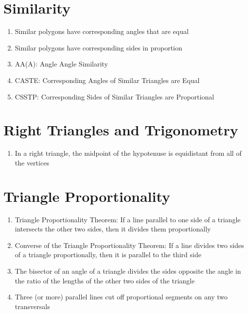\documentclass[11pt,letterpaper]{report}
\begin{document}
\section*{Similarity}
\begin{enumerate}
    \item Similar polygons have corresponding angles that are equal
    \item Similar polygons have corresponding sides in proportion
    \item AA(A): Angle Angle Similarity
    \item CASTE: Corresponding Angles of Similar Triangles are Equal
    \item CSSTP: Corresponding Sides of Similar Triangles are Proportional
\end{enumerate}

\section*{Right Triangles and Trigonometry}
\begin{enumerate}
    \item In a right triangle, the midpoint of the hypotenuse is equidistant from all of the vertices
\end{enumerate}

\section*{Triangle Proportionality}
\begin{enumerate}
    \item Triangle Proportionality Theorem: If a line parallel to one side of a triangle intersects the other two sides, then it divides them proportionally
    \item Converse of the Triangle Proportionality Theorem: If a line divides two sides of a triangle proportionally, then it is parallel to the third side
    \item The bisector of an angle of a triangle divides the sides opposite the angle in the ratio of the lengths of the other two sides of the triangle
    \item Three (or more) parallel lines cut off proportional segments on any two transversals
\end{enumerate}
\end{document}
